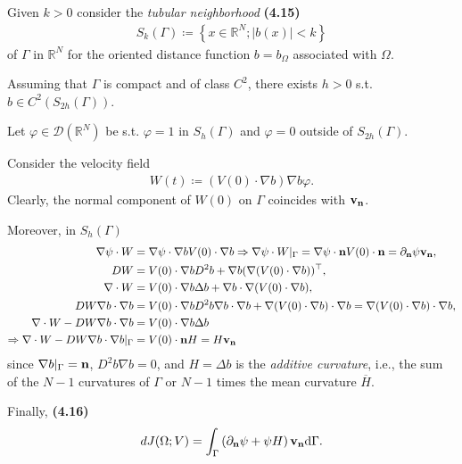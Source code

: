 \documentclass[oneside]{book}
\numberwithin{equation}{section}
\begin{document}
Given $k > 0$ consider the \textit{tubular neighborhood} \textbf{(4.15)}
\begin{align*}
    S_k(\Gamma)\coloneqq\left\{x\in\mathbb{R}^N;\left|b(x)\right| < k\right\}
\end{align*}
of $\Gamma$ in $\mathbb{R}^N$ for the oriented distance function $b = b_\Omega$ associated with $\Omega$.

Assuming that $\Gamma$ is compact and of class $C^2$, there exists $h > 0$ s.t. $b\in C^2(S_{2h}(\Gamma))$.

Let $\varphi\in\mathcal{D}(\mathbb{R}^N)$ be s.t. $\varphi = 1$ in $S_h(\Gamma)$ and $\varphi = 0$ outside of $S_{2h}(\Gamma)$.

Consider the velocity field
\begin{align*}
    W(t)\coloneqq(V(0)\cdot\nabla b)\nabla b\varphi.
\end{align*}
Clearly, the normal component of $W(0)$ on $\Gamma$ coincides with ${\bf v}_{\bf n}$.

Moreover, in $S_h(\Gamma)$
\begin{align*}
    \nabla\psi\cdot W &= \nabla\psi\cdot\nabla bV(0)\cdot\nabla b\Rightarrow\nabla\psi\cdot W|_\Gamma = \nabla\psi\cdot{\bf n}V(0)\cdot{\bf n} = \partial_{\bf n}\psi{\bf v}_{\bf n},\\
    DW &= V(0)\cdot\nabla bD^2b + \nabla b(\nabla(V(0)\cdot\nabla b))^\top,\\
    \nabla\cdot W &= V(0)\cdot\nabla b\Delta b + \nabla b\cdot\nabla(V(0)\cdot\nabla b),\\
    DW\nabla b\cdot\nabla b &= V(0)\cdot\nabla bD^2b\nabla b\cdot\nabla b + \nabla(V(0)\cdot\nabla b)\cdot\nabla b = \nabla(V(0)\cdot\nabla b)\cdot\nabla b,\\
    \nabla\cdot W - DW\nabla b\cdot\nabla b &= V(0)\cdot\nabla b\Delta b\\
    \Rightarrow\nabla\cdot W - DW\nabla b\cdot\nabla b|_\Gamma &= V(0)\cdot{\bf n}H = H{\bf v}_{\bf n}
\end{align*}
since $\nabla b|_\Gamma = {\bf n}$, $D^2b\nabla b = 0$, and $H = \Delta b$ is the \textit{additive curvature}, i.e., the sum of the $N - 1$ curvatures of $\Gamma$ or $N - 1$ times the mean curvature $\overline{H}$.

Finally, \textbf{(4.16)}
\begin{align*}
    dJ(\Omega;V) = \int_\Gamma \left(\partial_{\bf n}\psi + \psi H\right){\bf v}_{\bf n}{\rm d}\Gamma.
\end{align*}
\end{document}
